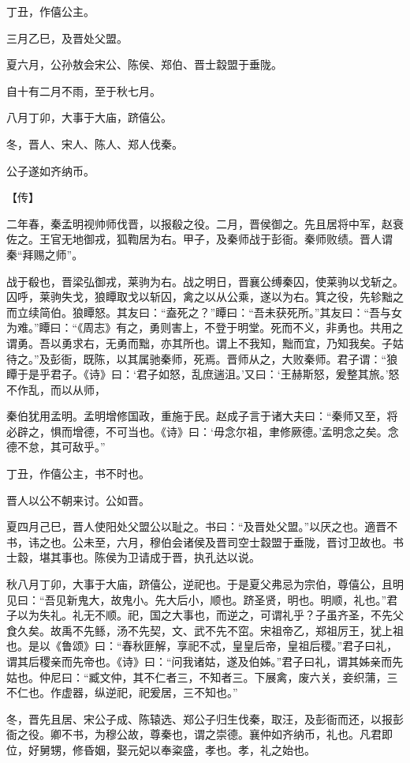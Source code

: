 \documentclass[a4paper,12pt,UTF8,twoside]{ctexbook}
\begin{document}
丁丑，作僖公主。

三月乙巳，及晋处父盟。

夏六月，公孙敖会宋公、陈侯、郑伯、晋士縠盟于垂陇。

自十有二月不雨，至于秋七月。

八月丁卯，大事于大庙，跻僖公。

冬，晋人、宋人、陈人、郑人伐秦。

公子遂如齐纳币。

【传】

二年春，秦孟明视帅师伐晋，以报殽之役。二月，晋侯御之。先且居将中军，赵衰佐之。王官无地御戎，狐鞫居为右。甲子，及秦师战于彭衙。秦师败绩。晋人谓秦“拜赐之师”。

战于殽也，晋梁弘御戎，莱驹为右。战之明日，晋襄公缚秦囚，使莱驹以戈斩之。囚呼，莱驹失戈，狼瞫取戈以斩囚，禽之以从公乘，遂以为右。箕之役，先轸黜之而立续简伯。狼瞫怒。其友曰：“盍死之？”瞫曰：“吾未获死所。”其友曰：“吾与女为难。”瞫曰：“《周志》有之，勇则害上，不登于明堂。死而不义，非勇也。共用之谓勇。吾以勇求右，无勇而黜，亦其所也。谓上不我知，黜而宜，乃知我矣。子姑待之。”及彭衙，既陈，以其属驰秦师，死焉。晋师从之，大败秦师。君子谓：“狼瞫于是乎君子。《诗》曰：‘君子如怒，乱庶遄沮。’又曰：‘王赫斯怒，爰整其旅。’怒不作乱，而以从师，

秦伯犹用孟明。孟明增修国政，重施于民。赵成子言于诸大夫曰：“秦师又至，将必辟之，惧而增德，不可当也。《诗》曰：‘毋念尔祖，聿修厥德。’孟明念之矣。念德不怠，其可敌乎。”

丁丑，作僖公主，书不时也。

晋人以公不朝来讨。公如晋。

夏四月己巳，晋人使阳处父盟公以耻之。书曰：“及晋处父盟。”以厌之也。適晋不书，讳之也。公未至，六月，穆伯会诸侯及晋司空士縠盟于垂陇，晋讨卫故也。书士縠，堪其事也。陈侯为卫请成于晋，执孔达以说。

秋八月丁卯，大事于大庙，跻僖公，逆祀也。于是夏父弗忌为宗伯，尊僖公，且明见曰：“吾见新鬼大，故鬼小。先大后小，顺也。跻圣贤，明也。明顺，礼也。”君子以为失礼。礼无不顺。祀，国之大事也，而逆之，可谓礼乎？子虽齐圣，不先父食久矣。故禹不先鲧，汤不先契，文、武不先不窋。宋祖帝乙，郑祖厉王，犹上祖也。是以《鲁颂》曰：“春秋匪解，享祀不忒，皇皇后帝，皇祖后稷。”君子曰礼，谓其后稷亲而先帝也。《诗》曰：“问我诸姑，遂及伯姊。”君子曰礼，谓其姊亲而先姑也。仲尼曰：“臧文仲，其不仁者三，不知者三。下展禽，废六关，妾织蒲，三不仁也。作虚器，纵逆祀，祀爰居，三不知也。”

冬，晋先且居、宋公子成、陈辕选、郑公子归生伐秦，取汪，及彭衙而还，以报彭衙之役。卿不书，为穆公故，尊秦也，谓之崇德。襄仲如齐纳币，礼也。凡君即位，好舅甥，修昏姻，娶元妃以奉粢盛，孝也。孝，礼之始也。
\end{document}
